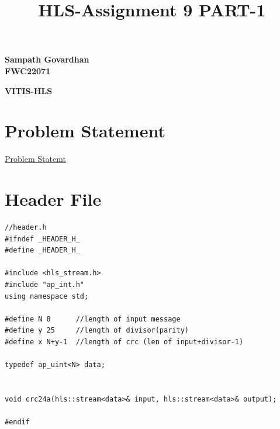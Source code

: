 \documentclass{article}
\title{
HLS-Assignment 9 PART-1
}
\begin{document}
\maketitle
\hfill \textbf{Sampath Govardhan} \\
\null \hfill \textbf{FWC22071}\\
\maketitle
\hfill \textbf{VITIS-HLS}
\section{Problem Statement}
\href{run:./problem_statement.pdf} {Problem Statemt}
\vspace{1cm}
\section{Header File}
\begin{lstlisting}
//header.h
#ifndef _HEADER_H_
#define _HEADER_H_

#include <hls_stream.h>
#include "ap_int.h"
using namespace std;

#define N 8      //length of input message
#define y 25     //length of divisor(parity)
#define x N+y-1  //length of crc (len of input+divisor-1)

typedef ap_uint<N> data;


void crc24a(hls::stream<data>& input, hls::stream<data>& output);

#endif



\end{lstlisting}

\vspace{15cm}
\end{document}

